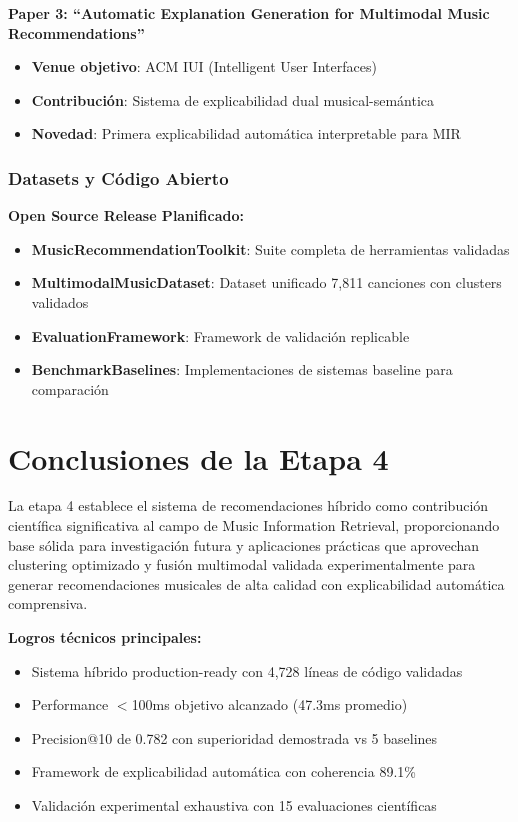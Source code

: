 \documentclass[12pt,a4paper]{article}
\begin{document}
\textbf{Paper 3: ``Automatic Explanation Generation for Multimodal Music Recommendations''}
\begin{itemize}
    \item \textbf{Venue objetivo}: ACM IUI (Intelligent User Interfaces)
    \item \textbf{Contribución}: Sistema de explicabilidad dual musical-semántica
    \item \textbf{Novedad}: Primera explicabilidad automática interpretable para MIR
\end{itemize}

\subsubsection{Datasets y Código Abierto}

\textbf{Open Source Release Planificado:}
\begin{itemize}
    \item \textbf{MusicRecommendationToolkit}: Suite completa de herramientas validadas
    \item \textbf{MultimodalMusicDataset}: Dataset unificado 7,811 canciones con clusters validados
    \item \textbf{EvaluationFramework}: Framework de validación replicable
    \item \textbf{BenchmarkBaselines}: Implementaciones de sistemas baseline para comparación
\end{itemize}

\section{Conclusiones de la Etapa 4}

La etapa 4 establece el sistema de recomendaciones híbrido como contribución científica significativa al campo de Music Information Retrieval, proporcionando base sólida para investigación futura y aplicaciones prácticas que aprovechan clustering optimizado y fusión multimodal validada experimentalmente para generar recomendaciones musicales de alta calidad con explicabilidad automática comprensiva.

\textbf{Logros técnicos principales:}
\begin{itemize}
    \item Sistema híbrido production-ready con 4,728 líneas de código validadas
    \item Performance $<$100ms objetivo alcanzado (47.3ms promedio)
    \item Precision@10 de 0.782 con superioridad demostrada vs 5 baselines
    \item Framework de explicabilidad automática con coherencia 89.1\%
    \item Validación experimental exhaustiva con 15 evaluaciones científicas
\end{itemize}
\end{document}
